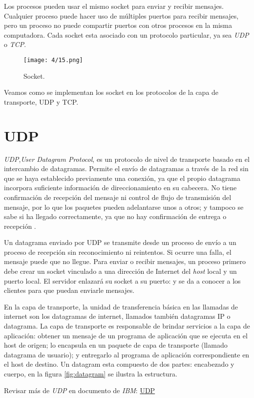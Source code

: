 Los \gls{procesos} pueden usar el mismo socket para enviar y recibir mensajes.   
Cualquier proceso puede hacer uso de múltiples puertos para recibir mensajes, pero un proceso no puede compartir puertos con otros procesos en la misma computadora. 
Cada socket esta asociado con un protocolo particular, ya sea \textit{UDP} o \textit{TCP}.


\begin{figure}%
	\texttt{[image: 4/15.png]}
	\caption{Socket.}
	\label{fig:socket}
\end{figure}

Veamos como se implementan los socket en los protocolos de la capa de transporte, UDP y TCP.

\section{UDP}
\textit{UDP},\textit{User Datagram Protocol}, es un protocolo de nivel de transporte basado en el intercambio de datagramas. Permite el envío de datagramas a través de la red sin que se haya establecido previamente una conexión, ya que el propio datagrama incorpora suficiente información de direccionamiento en su cabecera. No tiene confirmación de recepción del mensaje ni control de flujo de transmisión del mensaje, por lo que los paquetes pueden adelantarse unos a otros; y tampoco se sabe si ha llegado correctamente, ya que no hay confirmación de entrega o recepción .

Un datagrama enviado por UDP se transmite desde un proceso de envío a un proceso de recepción sin reconocimiento ni reintentos. Si ocurre una falla, el mensaje puede que no llegue.   Para enviar o recibir mensajes, un proceso primero debe crear un socket vinculado a una dirección de Internet del \textit{host} local y un puerto local. El  servidor enlazará su socket a su puerto: y se da a conocer a los clientes para que puedan enviarle mensajes. 
  

	\begin{kaobox}[frametitle=Datagrama]
		En la capa de transporte, la unidad de transferencia básica en las llamadas de internet son los datagramas de internet, llamados también datagramas IP o \gls{datagrama}.
		 La capa de transporte es responsable de brindar servicios a la capa de aplicación: obtener un mensaje de un programa de aplicación que se ejecuta en el host de origen; lo encapsula en un paquete de capa de transporte (llamado datagrama de usuario);  y entregarlo al programa de aplicación correspondiente en el host de destino.
		 Un datagram esta compuesto de dos partes: encabezado y cuerpo, en la figura \ref{fig:datagram} se ilustra la estructura.
		 
	  	Revisar m\'as de \textit{UDP} en documento de \textit{IBM}:  \href{https://www.ibm.com/docs/es/aix/7.1?topic=protocols-user-datagram-protocol}{UDP}
		
\end{kaobox}  

